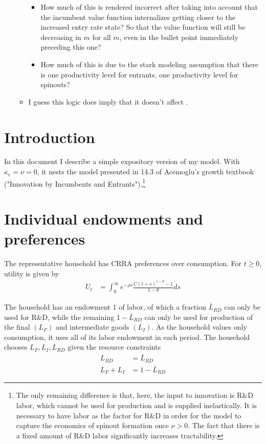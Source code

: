\documentclass[12pt,english]{article}
\theoremstyle{remark}
\begin{document}
\begin{enumerate}
\begin{itemize}
\begin{itemize}
			\item How much of this is rendered incorrect after taking into account that the incumbent value function internalizes getting closer to the increased entry rate state? So that the value function will still be decreasing in $m$ for all $m$, even in the bullet point immediately preceding this one?  
			\item How much of this is due to the stark modeling assumption that there is one productivity level for entrants, one productivity level for spinouts?
		\end{itemize}
		\item I guess this logic does imply that it doesn't affect .
	\end{itemize}
\end{enumerate}

\section{Introduction}

In this document I describe a simple expository version of my model.  With $\kappa_e = \nu = 0$, it nests the model presented in 14.3 of Acemoglu's growth textbook ("Innovation by Incumbents and Entrants").\footnote{The only remaining difference is that, here, the input to innovation is R\&D labor, which cannot be used for production and is supplied inelastically. It is necessary to have labor as the factor for R\&D in order for the model to capture the economics of spinout formation once $\nu > 0$. The fact that there is a fixed amount of R\&D labor significantly increases tractability.}

\section{Individual endowments and preferences}

The representative household has CRRA preferences over consumption. For $t \ge 0$, utility is given by 
\begin{align}
U_t &= \int_0^{\infty} e^{-\rho s} \frac{C(t+s)^{1-\theta} - 1}{1-\theta} ds \label{preferences}
\end{align}

The household has an endowment 1 of labor, of which a fraction $\bar{L}_{RD}$ can only be used for R\&D, while the remaining $1 - \bar{L}_{RD}$ can only be used for production of the final $(L_F)$ and intermediate goods $(L_I)$. As the household values only consumption, it uses all of its labor endowment in each period. The household chooses $L_F,L_I,L_{RD}$ given the resource constraints
\begin{align}
L_{RD} &= \bar{L}_{RD} \label{labor_resource_constraint2} \\
L_F + L_I &= 1 - \bar{L}_{RD} \label{labor_resource_constraint} 
\end{align}
\end{document}
